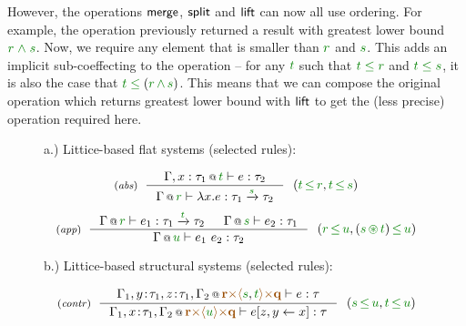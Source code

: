 However, the operations $\textnormal{\sffamily merge}$, $\textnormal{\sffamily split}$ and $\textnormal{\sffamily lift}$ can now all
use ordering. For example, the  operation previously returned
a result with greatest lower bound $\cclrd{r}\;\czip\;\cclrd{s}$. Now, we require any
element that is smaller than $\cclrd{r}$ and $\cclrd{s}$. This adds an implicit sub-coeffecting
to the operation -- for any $\cclrd{t}$ such that $\cclrd{t}\;\cleq\;\cclrd{r}$ and 
$\cclrd{t}\;\cleq\;\cclrd{s}$, it is also the case that $\cclrd{t}\;\cleq\;(\cclrd{r}\,\czip\,\cclrd{s})$.
This means that we can compose the original  operation which returns greatest lower
bound with $\textnormal{\sffamily lift}$ to get the (less precise) operation required here.


\begin{figure}[t]
{\small a.) Littice-based flat systems (selected rules):}

\begin{equation*}
\tyrule{abs}
  {\coctx{\Gamma, x:\tau_1}{\cclrd{t}} \vdash e : \tau_2}
  {\coctx{\Gamma}{\cclrd{r}} \vdash \lambda x.e : \tau_1 \xrightarrow{\cclrd{s}} \tau_2 }
~~(\cclrd{t}\,\cleq\,\cclrd{r}, \cclrd{t}\,\cleq\,\cclrd{s})
\end{equation*}
\begin{equation*}
\tyrule{app}
  {\coctx{\Gamma}{\cclrd{r}} \vdash e_1 : \tau_1 \xrightarrow{\cclrd{t}} \tau_2 &
   \coctx{\Gamma}{\cclrd{s}} \vdash e_2 : \tau_1 }
  {\coctx{\Gamma}{\cclrd{u}} \vdash e_1~e_2 : \tau_2}
~~(\cclrd{r}\,\cleq\,\cclrd{u}, (\cclrd{s} \,\cseq\, \cclrd{t})\,\cleq\,\cclrd{u})
\end{equation*}

\vspace{1.5em}
{\small b.) Littice-based structural systems (selected rules):}

\begin{equation*}
\tyrule{contr}
  {\coctx{\Gamma_1,y\!:\!\tau_1,z\!:\!\tau_1,\Gamma_2}{\aclrd{\textbf{r}} \atimes \alift{\cclrd{s},\cclrd{t}} \atimes \aclrd{\textbf{q}}} \vdash e : \tau}
  {\coctx{\Gamma_1,x\!:\!\tau_1,\Gamma_2}{\aclrd{\textbf{r}} \atimes \alift{\cclrd{u}} \atimes \aclrd{\textbf{q}}} \vdash \subst{e}{z,y}{x} : \tau}
~~(\cclrd{s}\,\cleq\,\cclrd{u}, \cclrd{t}\,\cleq\,\cclrd{u})
\end{equation*}

\label{fig:unified-lattice-types}
\end{figure}

